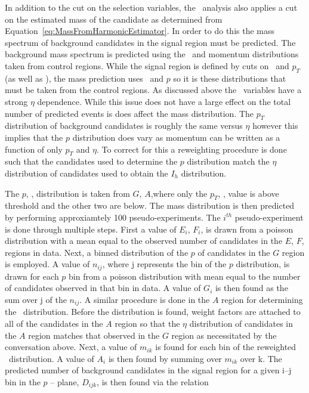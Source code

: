 In addition to the cut on the selection variables, the \tktof\ analysis also applies a cut on the estimated mass of the candidate as determined from 
Equation~\ref{eq:MassFromHarmonicEstimator}. In order to do this the mass spectrum of background candidates in the signal region must be predicted.
The background mass spectrum is predicted using the \dedx\ and momentum distributions taken from control regions. While the signal region is defined by cuts on \ias\ and
$p_T$ (as well as \invbeta), the mass prediction uses \ih\ and $p$ so it is these distributions that must be taken from the control regions. As discussed above the
\dedx\ variables have a strong $\eta$ dependence. While this issue does not have a large effect on the total number of predicted events is does affect the mass distribution.
The $p_T$ distribution of background candidates is roughly the same versus $\eta$ however this implies that the $p$ distribution does vary as momentum can be written
as a function of only $p_T$ and $\eta$. To correct for this a reweighting procedure is done such that the candidates
used to determine the $p$ distribution match the $\eta$ distribution of candidates used to obtain the $I_h$ distribution.

The $p$, \ih, distribution
is taken from $G$, $A$,where only the $p_T$, \ias, value is above threshold and the other two are below. The mass distribution is then predicted by performing
approxiamtely 100 pseudo-experiments. The $i^{th}$ pseudo-experiment is done through multiple steps. First a value of $E_{i}$, $F_i$, is drawn from a poisson
distribution with a mean equal to the observed number of candidates in the $E$, $F$, regions in data.
Next, a binned distribution of the $p$ of candidates in the $G$ region is employed. A value of $n_{ij}$, where j represents the bin of the $p$ distribution, is drawn for
each $p$ bin from a poisson distribution with mean equal to the number of candidates observed in that bin in data. A value of $G_i$ is then found as the sum over j of the
$n_{ij}$. A similar procedure is done in the $A$ region for determining the \ih\ distribution. Before the distribution is found, weight factors are attached to all of
the candidates in the $A$ region so that the $\eta$ distribution of candidates in the $A$ region matches that observed in the $G$ region as necessitated by the conversation
above. Next, a value of $m_{ik}$ is found for each bin of the reweighted \ih\ distribution. A value of $A_i$ is then found by summing over $m_{ik}$ over k.
The predicted number of background candidates in the signal region for a given i--j bin in the $p$ -- \dedx plane, $D_{ijk}$, is then found via the relation

